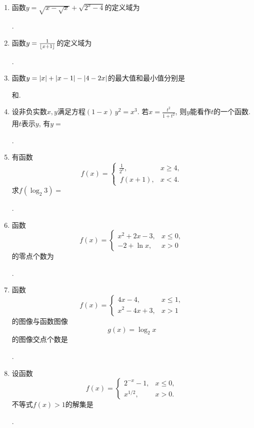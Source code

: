 \documentclass[a4paper,punct=CCT]{ctexbook}
\theoremstyle{break}
\newif\ifshowsol
\let\leq\leqslant
\let\le\leq
\let\geq\geqslant
\let\ge\geq}
\begin{document}
\begin{enumerate}
\item 函数\(y = \sqrt{x - \sqrt{x}} + \sqrt{2^x - 4}\)的定义域为
  \ifshowsol
  \uline{\makebox[5em]{\(\brktparen{2, +\infty}\)}}.
  \else
  \uline{\makebox[5em]{}}.
  \fi

\item 函数\(y = \frac1{\lfloor x+1\rfloor}\)的定义域为
  \ifshowsol
  \uline{\makebox[10em]{\(\paren{-\infty, -1} \cup \brktparen{0, +\infty}\)}}.
  \else
  \uline{\makebox[10em]{}}.
  \fi

\item 函数\(y = \lvert x\rvert + \lvert x-1\rvert - \lvert4-2x\rvert\)的最大值和最小值分别是
  \ifshowsol
  \uline{\makebox[3em]{\(-3\)}}和\uline{\makebox[3em]{\(3\)}}.
  \else
  \uline{\makebox[3em]{}}和\uline{\makebox[3em]{}}.
  \fi

\item 设非负实数\(x, y\)满足方程\((1-x)\,y^2 = x^3\).  若\(x = \frac{t^2}{1+t^2}\), 则\(y\)能看作\(t\)的一个函数.  用\(t\)表示\(y\), 有\(y =\)
  \ifshowsol
  \uline{\makebox[6em]{\(t^3/\paren{1+t^2}\)}}.
  \else
  \uline{\makebox[6em]{}}.
  \fi

\item 有函数
  \[
    f(x) =
    \begin{cases}
      \frac1{2^x}, & x \ge 4, \\
      \,f(x+1), & x < 4.
    \end{cases}
  \]
  求\(f(\log_2 3) =\)
  \ifshowsol
  \uline{\makebox[4em]{\(1/{24}\)}}.
  \else
  \uline{\makebox[4em]{}}.
  \fi

\item 函数
  \[
    f(x) =
    \begin{cases}
      x^2 + 2x - 3, & x \le 0, \\
      -2 + \ln x, & x > 0
    \end{cases}
  \]
  的零点个数为
  \ifshowsol
  \uline{\makebox[3em]{\(2\)}}.
  \else
  \uline{\makebox[3em]{}}.
  \fi

\item 函数
  \[
    f(x) =
    \begin{cases}
      4x - 4, & x \le 1, \\
      x^2 - 4x + 3, & x > 1
    \end{cases}
  \]
  的图像与函数图像
  \[
    g(x) = \log_2 x
  \]
  的图像交点个数是
  \ifshowsol
  \uline{\makebox[3em]{\(3\)}}.
  \else
  \uline{\makebox[3em]{}}.
  \fi

\item 设函数
  \[
    f(x) =
    \begin{cases}
      2^{-x} - 1, & x \le 0, \\
      x^{1/2}, & x > 0.
    \end{cases}
  \]
  不等式\(f(x) > 1\)的解集是
  \ifshowsol
  \uline{\makebox[10em]{\(\paren{-\infty, -1} \cup \paren{1, +\infty}\)}}.
  \else
  \uline{\makebox[10em]{}}.
  \fi


\end{enumerate}
\end{document}
